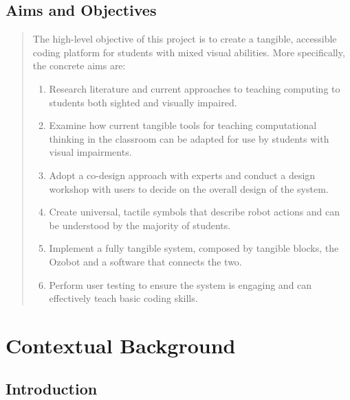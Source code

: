 \documentclass[oneside,%
                    author={Malak Hajji},
                    degree={BSc},
                    title={Designing An Accessible Computational Toolkit For Students},
                  subtitle={With Mixed Visual Abilities}]{dissertation}
\begin{document}
\section{Aims and Objectives}

\begin{quote}
\noindent
The high-level objective of this project is to create a tangible, accessible coding platform for students with mixed visual abilities. More specifically, the concrete aims are:

\begin{enumerate}
\item Research literature and current approaches to teaching computing to students both sighted and visually impaired.
\item Examine how current tangible tools for teaching computational thinking in the classroom can be adapted for use by students with visual impairments.
\item Adopt a co-design approach with experts and conduct a design workshop with users to decide on the overall design of the system.
\item Create universal, tactile symbols that describe robot actions and can be understood by the majority of students.
\item Implement a fully tangible system, composed by tangible blocks, the Ozobot and a software that connects the two.
\item Perform user testing to ensure the system is engaging and can effectively teach basic coding skills.
\end{enumerate}
\end{quote}



\chapter{Contextual Background}
\label{chap:context}

\section{Introduction}
\end{document}
